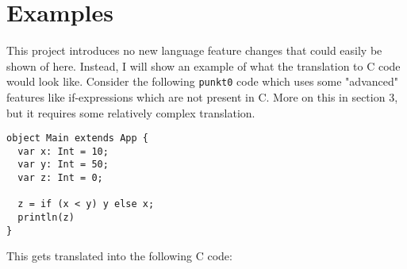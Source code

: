 \section{Examples}
This project introduces no new language feature changes that could easily be shown of here. Instead, I will show an example of what the translation to C code would look like. Consider the following \texttt{punkt0} code which uses some "advanced" features like if-expressions which are not present in C. More on this in section 3, but it requires some relatively complex translation.

\begin{lstlisting}
object Main extends App {
  var x: Int = 10;
  var y: Int = 50;
  var z: Int = 0;

  z = if (x < y) y else x;
  println(z)
}
\end{lstlisting}
This gets translated into the following C code:

